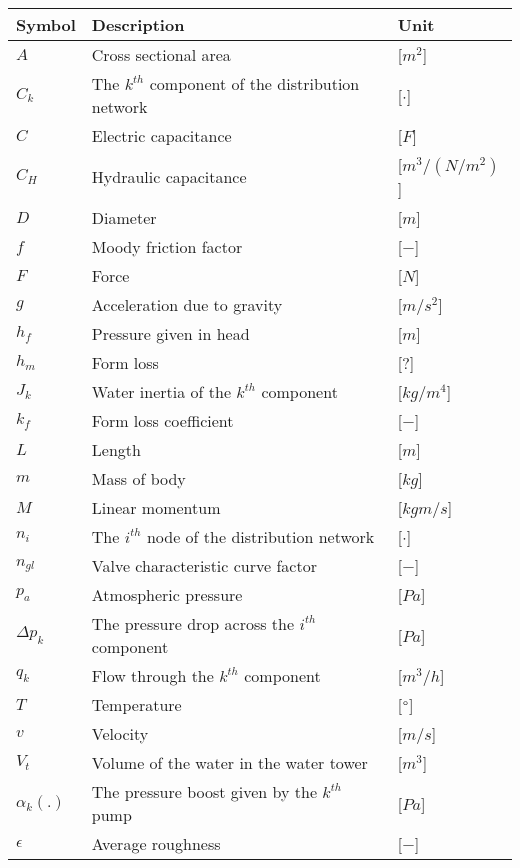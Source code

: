 \begin{tabular}{l l l} 
	\textbf{Symbol}	&	\textbf{Description}										& \textbf{Unit}	\\\hline
	$A$				&	Cross sectional area									    & [$m^2$]\\
	$C_k$			&	The $k^{th}$ component of the distribution network     		& [$\cdot$]\\
	$C$				&	Electric capacitance								   		& [$F$]\\
	$C_H$			&	Hydraulic capacitance								   		& [$m^3/(N/m^2)$]\\
	$D$				&	Diameter									     			& [$m$]\\
	$f$				&	Moody friction factor									    & [$-$]\\
	$F$				&	Force									     				& [$N$]\\
	$g$				&	Acceleration due to gravity									& [$m/s^2$]\\
	$h_f$			&	Pressure given in head									    & [$m$]\\
	$h_m$			&	Form loss									    			& [$?$]\\
	$J_k$			&	Water inertia of the $k^{th}$ component						& [$kg/m^4$]\\
	$k_f$			&	Form loss coefficient								    	& [$-$]\\
	$L$				&	Length									     				& [$m$]\\
	$m$				&	Mass of body									     		& [$kg$]\\
	$M$				&	Linear momentum									     		& [$kgm/s$]\\
	$n_i$			&	The $i^{th}$ node of the distribution network     			& [$\cdot$]\\
	$n_{gl}$		&	Valve characteristic curve factor							& [$-$]\\
	$p_a$			&	Atmospheric pressure							      		& [$Pa$]\\
	$\Delta p_k$	&	The pressure drop across the $i^{th}$ component      		& [$Pa$]\\
	$q_k$			&	Flow through the $k^{th}$ component 		     			& [$m^3/h$]\\
	$T$				&	Temperature									     			& [$\degree$]\\
	$v$				&	Velocity									     			& [$m/s$]\\
	$V_t$			&	Volume of the water in the water tower									& [$m^3$]\\
	$\alpha_k(.)$	&	The pressure boost given by the	$k^{th}$ pump				& [$Pa$]\\
	$\epsilon$		&	Average roughness									     	& [$-$]\\

\end{tabular}
